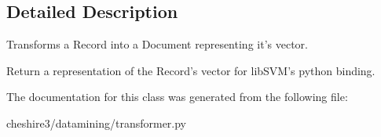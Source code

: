 \subsection{Detailed Description}
\begin{DoxyVerb}Transforms a Record into a Document representing it's vector.

Return a representation of the Record's vector for libSVM's python binding.
\end{DoxyVerb}
 

The documentation for this class was generated from the following file\-:\begin{DoxyCompactItemize}
\item 
cheshire3/datamining/transformer.\-py\end{DoxyCompactItemize}
